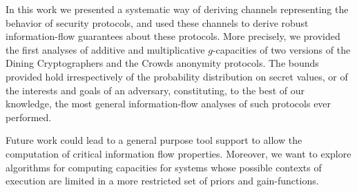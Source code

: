 In this work we presented a systematic way of deriving channels
representing the behavior of security protocols, and used
these channels to derive robust information-flow guarantees
about these protocols.
More precisely, we provided the first analyses of additive
and multiplicative $g$-capacities of two versions of the
Dining Cryptographers and the Crowds anonymity protocols.
The bounds provided hold irrespectively of the probability 
distribution on secret values, or of the interests and goals 
of an adversary, constituting, to the best of our knowledge,
the most general information-flow analyses of such protocols 
ever performed.

Future work could lead to a general purpose tool support to allow 
the computation of critical information flow properties.
Moreover, we want to explore algorithms for computing capacities
for systems whose possible contexts of execution are limited
in a more restricted set of priors and gain-functions.

%
%
%
